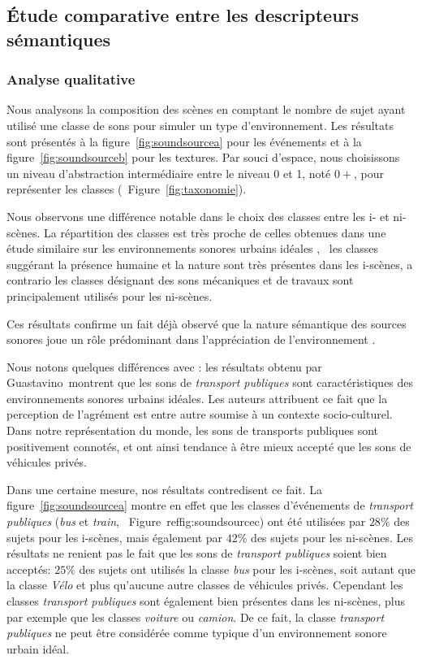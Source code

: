 \subsection{Étude comparative entre les descripteurs sémantiques}

\subsubsection{Analyse qualitative}

Nous analysons la composition des scènes en comptant le nombre de sujet ayant utilisé une classe de sons pour simuler un type d'environnement. Les résultats sont présentés à la figure~\ref{fig:soundsourcea} pour les événements et à la figure~\ref{fig:soundsourceb} pour les textures. Par souci d'espace, nous choisissons un niveau d'abstraction intermédiaire entre le niveau 0 et 1, noté $0+$, pour représenter les classes (\cf~Figure~\ref{fig:taxonomie}).

Nous observons une différence notable dans le choix des classes entre les i- et ni-scènes. La répartition des classes est très proche de celles obtenues dans une étude similaire sur les environnements sonores urbains idéales \citep{guastavino2006ideal}, \ie~les classes suggérant la présence humaine et la nature sont très présentes dans les i-scènes, a contrario les classes désignant des sons mécaniques et de travaux sont principalement utilisés pour les ni-scènes.

Ces résultats confirme un fait déjà observé que la nature sémantique des sources sonores joue un rôle prédominant dans l'appréciation de l'environnement \citep{raimbault2005urban,dubois2006cognitive}.

Nous notons quelques différences avec \citep{guastavino2006ideal}: les résultats obtenu par Guastavino~\al montrent que les sons de \emph{transport publiques} sont caractéristiques des environnements sonores urbains idéales. Les auteurs attribuent ce fait que la perception de l'agrément est entre autre soumise à un contexte socio-culturel. Dans notre représentation du monde, les sons de transports publiques sont positivement connotés, et ont ainsi tendance à être mieux accepté que les sons de véhicules privés.

Dans une certaine mesure, nos résultats contredisent ce fait. La figure~\ref{fig:soundsourcea}  montre en effet que les classes d'événements de \emph{transport publiques} (\emph{bus} et \emph{train}, \cf~Figure~ref{fig:soundsourcec}) ont été utilisées par $28\%$ des sujets pour les i-scènes, mais également  par $42\%$ des sujets pour les ni-scènes. Les résultats ne renient pas le fait que  les sons de \emph{transport publiques} soient bien acceptés: $25\%$ des sujets ont utilisés la classe \emph{bus} pour les i-scènes, soit autant que la classe \emph{Vélo} et plus qu'aucune autre classes de véhicules privés. Cependant les classes \emph{transport publiques} sont également bien présentes dans les ni-scènes, plus par exemple que les classes \emph{voiture} ou \emph{camion}. De ce fait, la classe \emph{transport publiques} ne peut être considérée comme typique d'un environnement sonore urbain idéal.

